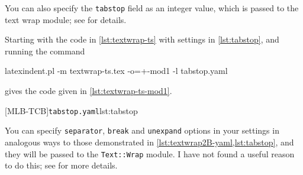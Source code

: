  You can also specify the \texttt{tabstop} field  as an integer value, which is passed to the text wrap module; see
 \cite{textwrap} for details.

 \begin{example}
 Starting with the code in \cref{lst:textwrap-ts} with settings in \cref{lst:tabstop}, and
 running the command  
 \begin{commandshell}
	 latexindent.pl -m textwrap-ts.tex -o=+-mod1 -l tabstop.yaml
	 \end{commandshell}
 gives the code given in \cref{lst:textwrap-ts-mod1}.
 \begin{cmhtcbraster}[raster columns=3,
   raster left skip=-3.5cm,
   raster right skip=-2cm,
   raster column skip=.03\linewidth]
  [MLB-TCB]{\texttt{tabstop.yaml}}{lst:tabstop}
 \end{cmhtcbraster}
 \end{example}

 You can specify \texttt{separator}, \texttt{break} and \texttt{unexpand} options in your
 settings in analogous ways to those demonstrated in
 \cref{lst:textwrap2B-yaml,lst:tabstop}, and they will be passed to the
 \texttt{Text::Wrap} module. I have not found a useful reason to do this; see
 \cite{textwrap} for more details.
